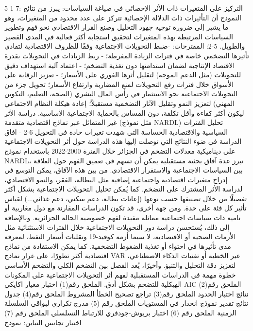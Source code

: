 \documentclass[12pt,a4paper]{report}
\begin{document}
5-1-7: التركيز على المتغيرات ذات الأثر الإحصائي في صياغة السياسات:
يبرز من نتائج النموذج أن التأثيرات ذات الدلالة الإحصائية تتركز على عدد محدود من المتغيرات، وهو ما يشير إلى ضرورة توجيه جهود التحليل وصنع القرار الاقتصادي نحو فهم وتطوير السياسات المرتبطة بهذه المتغيرات لتحقيق استجابة أكثر فعالية في المدى القصير والطويل.
5-2: المقترحات:
-ضبط التحويلات الاجتماعية وفقًا للظروف الاقتصادية لتفادي تأثيرها التضخمي خاصة في فترات الزيادة المفرطة؛
- ربط الزيادات في التحويلات بقدرة الاقتصاد الإنتاجية لضمان استدامتها دون تغذية التضخم؛
- اعتماد آلية استهداف دقيق للتحويلات (مثل الدعم الموجه) لتقليل أثرها الفوري على الأسعار؛
- تعزيز الرقابة على الأسواق خلال فترات رفع التحويلات لمنع المضاربة وارتفاع الأسعار؛
تحويل جزء من التحويلات الاجتماعية نحو الاستثمار في رأس المال البشري (الصحة، التعليم، التكوين المهني) لتعزيز النمو وتقليل الآثار التضخمية مستقبلاً؛
إعادة هيكلة النظام الاجتماعي ليكون أكثر كفاءة وأقل تكلفة، دون المساس بالحماية الاجتماعية الأساسية.
دراسة الأثر غير المتماثل عبر نماذج اقتصادية متقدمة (مثل نموذج NARDL)
تحليل الفترات السياسية والاقتصادية الحساسة التي شهدت تغيرات حادة في التحويل
6-2 - افاق الدراسة 
في ضوء النتائج التي توصلت إليها هذه الدراسة حول أثر التحويلات الاجتماعية على ديناميكية معدلات التضخم في الجزائر خلال الفترة 2000-2022 باستخدام نموذج NARDL، تبرز عدة آفاق بحثية مستقبلية يمكن أن تسهم في تعميق الفهم حول العلاقة بين السياسات الاجتماعية والاستقرار الاقتصادي. من بين هذه الآفاق، يمكن التوسع في إدراج متغيرات اقتصادية واجتماعية إضافية مثل البطالة، الفقر، والنمو الاقتصادي، لدراسة الأثر المشترك على التضخم. كما يُمكن تحليل التحويلات الاجتماعية بشكل أكثر تفصيلًا من خلال تصنيفها حسب نوعها (إعانات بطالة، دعم سكني، دعم غذائي...) لقياس تأثير كل فئة على حدة. ومن جهة أخرى، قد تكون الدراسات المقارنة مع دول مغاربية أو نامية ذات سياسات اجتماعية مماثلة مفيدة لفهم خصوصية الحالة الجزائرية. وبالإضافة إلى ذلك، يُستحسن دراسة دور التحويلات الاجتماعية خلال الفترات الاستثنائية مثل الأزمات الصحية أو الاقتصادية، لا سيما أزمة كوفيد-19 وتقلبات أسعار النفط، لمعرفة مدى تأثيرها في احتواء أو تغذية الضغوط التضخمية. كما يمكن الاستفادة من نماذج اقتصادية أكثر تطورًا، على غرار نماذج VAR غير الخطية أو تقنيات الذكاء الاصطناعي، لتعزيز دقة التحليل والتنبؤ. وأخيرًا، يُعد الفصل بين التضخم الكلي والتضخم الأساسي خطوة مهمة في الدراسات المستقبلية لفهم أثر التحويلات الاجتماعية على المكونات الهيكلية للتضخم بشكل أدق.
الملحق رقم(1) اختبار معيار اكايكي AIC 
الملحق رقم(2) نتائج اختبار الحدود 
الملحق رقم(3) تراجع تصحيح الخطأ المشروط 
الملحق رقم(4) جدول نتائج تقدير نموذج انحدار في المستويات 
الملحق رقم (5) مدرج تكراري لبواقي السلسلة الزمنية 
الملحق رقم (6) اختبار بريوش-جودفري للارتباط التسلسلي 
الملحق رقم (7) اختبار تجانس التباين: نموذج
\end{document}

